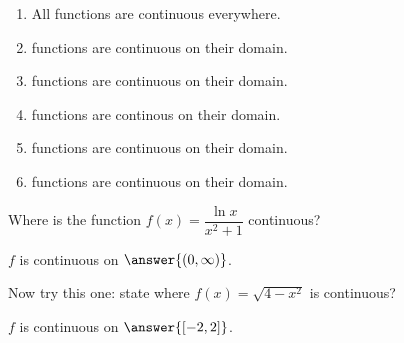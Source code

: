 \documentclass{ximera}
\begin{document}
\begin{enumerate}
  \item All  functions are continuous everywhere.
  \item {} functions are continuous on their domain.
  \item {} functions are continuous on their domain.
  \item {} functions are continous on their domain.
  \item {} functions are continuous on their domain.
  \item {} functions are continuous on their domain.
\end{enumerate}

\begin{example}
\label{example:3-18}
Where is the function $f(x)=\dfrac{\ln x}{x^{2}+1}$ continuous?

$f$ is continuous on $\answer{(0,\infty)}$.
\end{example}

\begin{exercise}
\label{exercise:3-19}
Now try this one: state where $f(x)=\sqrt{4-x^{2}}$ is continuous?

$f$ is continuous on $\answer{[-2,2]}$.
\end{exercise}
\end{document}

